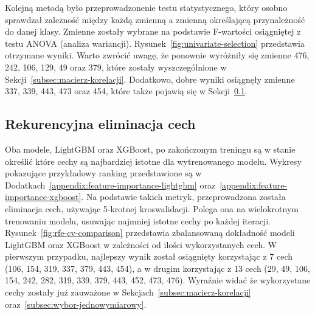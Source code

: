 \documentclass[a4paper,12pt]{article}
\begin{document}
    Kolejną metodą było przeprowadzonenie testu statystycznego, który osobno sprawdzał zależność między każdą zmienną a zmienną określającą przynależność do danej klasy.
    Zmienne zostały wybrane na podstawie F-wartości osiągniętej z testu ANOVA (analiza wariancji).
    Rysunek~\ref{fig:univariate-selection} przedstawia otrzymane wyniki.
    Warto zwrócić uwagę, że ponownie wyróżniły się zmienne 476, 242, 106, 129, 49 oraz 379, które zostały wyszczególnione w Sekcji~\ref{subsec:macierz-korelacji}.
    Dodatkowo, dobre wyniki osiągnęły zmienne 337, 339, 443, 473 oraz 454, które także pojawią się w Sekcji~\ref{subsec:rekurencyjna-eliminacja-cech}.

    \subsection{Rekurencyjna eliminacja cech}\label{subsec:rekurencyjna-eliminacja-cech}

    Oba modele, LightGBM oraz XGBoost, po zakończonym treningu są w stanie określić które cechy są najbardziej istotne dla wytrenowanego modelu.
    Wykresy pokazujące przykładowy ranking przedstawione są w Dodatkach~\ref{appendix:feature-importance-lightgbm} oraz~\ref{appendix:feature-importance-xgboost}.
    Na podstawie takich metryk, przeprowadzona została eliminacja cech, używając 5-krotnej kroswalidacji.
    Polega ona na wielokrotnym trenowaniu modelu, usuwając najmniej istotne cechy po każdej iteracji.
    Rysunek~\ref{fig:rfe-cv-comparison} przedstawia zbalansowaną dokładność modeli LightGBM oraz XGBoost w zależności od ilości wykorzystanych cech.
    W pierwszym przypadku, najlepszy wynik został osiągnięty korzystając z 7 cech (106, 154, 319, 337, 379, 443, 454), a w drugim korzystając z 13 cech (29, 49, 106, 154, 242, 282, 319, 339, 379, 443, 452, 473, 476).
    Wyraźnie widać że wykorzystane cechy zostały już zauważone w Sekcjach~\ref{subsec:macierz-korelacji} oraz~\ref{subsec:wybor-jednowymiarowy}.
\end{document}
